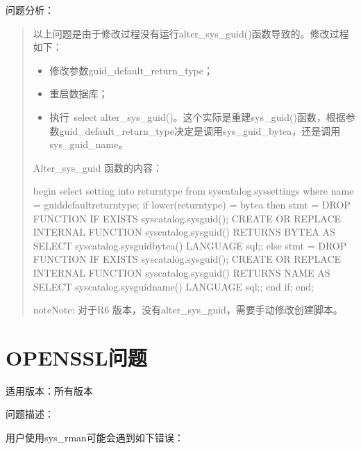 \documentclass[a4,10pt,oneside,english]{sphinxmanual}
\begin{document}
问题分析：
\begin{quote}

以上问题是由于修改过程没有运行alter\_sys\_guid()函数导致的。修改过程如下：
\begin{itemize}
\item {} 
修改参数guid\_default\_return\_type；

\item {} 
重启数据库；

\item {} 
执行 select alter\_sys\_guid()。这个实际是重建sys\_guid()函数，根据参数guid\_default\_return\_type决定是调用sys\_guid\_bytea，还是调用sys\_guid\_name。

\end{itemize}

Alter\_sys\_guid 函数的内容：

\begin{sphinxVerbatim}[commandchars=\\\{\}]
begin
  select setting into return\PYGZus{}type from sys\PYGZus{}catalog.sys\PYGZus{}settings where name = \PYGZsq{}guid\PYGZus{}default\PYGZus{}return\PYGZus{}type\PYGZsq{};
  if lower(return\PYGZus{}type) = \PYGZsq{}bytea\PYGZsq{} then
    stmt = \PYGZsq{}DROP FUNCTION IF EXISTS sys\PYGZus{}catalog.sys\PYGZus{}guid();
     CREATE OR REPLACE INTERNAL FUNCTION sys\PYGZus{}catalog.sys\PYGZus{}guid() RETURNS BYTEA AS
\PYGZdl{}\PYGZdl{}SELECT sys\PYGZus{}catalog.sys\PYGZus{}guid\PYGZus{}bytea()\PYGZdl{}\PYGZdl{} LANGUAGE sql;\PYGZsq{};
  else
    stmt = \PYGZsq{}DROP FUNCTION IF EXISTS sys\PYGZus{}catalog.sys\PYGZus{}guid();
     CREATE OR REPLACE INTERNAL FUNCTION sys\PYGZus{}catalog.sys\PYGZus{}guid() RETURNS NAME AS
\PYGZdl{}\PYGZdl{}SELECT sys\PYGZus{}catalog.sys\PYGZus{}guid\PYGZus{}name()\PYGZdl{}\PYGZdl{} LANGUAGE sql;\PYGZsq{};
  end if;
end;
\end{sphinxVerbatim}

\begin{sphinxadmonition}{note}{Note:}
对于R6 版本，没有alter\_sys\_guid，需要手动修改创建脚本。
\end{sphinxadmonition}
\end{quote}


\section{OPENSSL问题}
\label{\detokenize{sql:openssl}}
适用版本：所有版本

问题描述：

用户使用sys\_rman可能会遇到如下错误：
\end{document}
